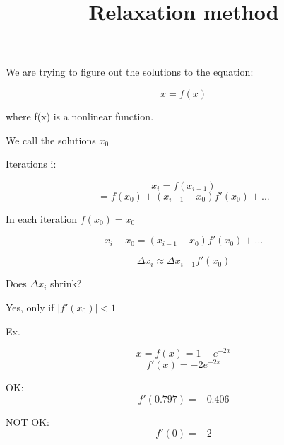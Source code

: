 \documentclass{article}
\title{Relaxation method}
\begin{document}
  \maketitle
  \newpage

We are trying to figure out the solutions to the equation:

$$x=f(x)$$

where f(x) is a nonlinear function.

We call the solutions $x_0$

Iterations i:

$$x_i = f(x_{i-1}) $$
$$= f(x_0) + (x_{i-1}-x_0)f'(x_0) + ...$$

In each iteration $f(x_0) = x_0$

$$x_i - x_0 = (x_{i-1}-x_0)f'(x_0) + ... $$

$$\Delta x_i \approx \Delta x_{i-1} f'(x_0)$$

Does $\Delta x_i $ shrink?

Yes, only if $|f'(x_0)| < 1$

\newpage

Ex.

$$x = f(x) = 1 - e^{-2x}$$
$$f'(x) = -2e^{-2x}$$

OK:
$$f'(0.797) = -0.406$$

NOT OK:
$$f'(0) = -2$$
\end{document}

